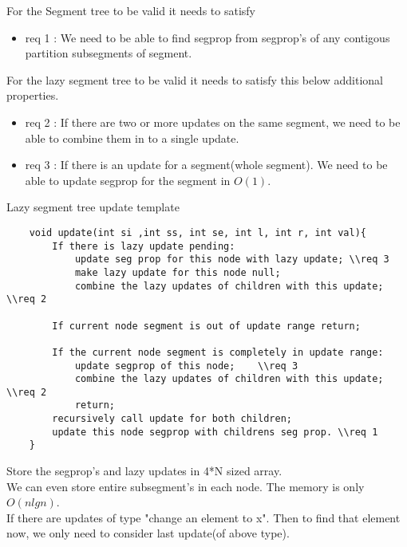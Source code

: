 \documentclass[../Notes.tex]{subfiles}
\begin{document}
For the Segment tree to be valid it needs to satisfy
\begin{itemize}
	\item req 1 : We need to be able to find segprop from segprop's of any contigous partition subsegments of segment. 
\end{itemize}

For the lazy segment tree to be valid it needs to satisfy this below additional properties.
\begin{itemize}
	\item req 2 : If there are two or more updates on the same segment, we need to be able to combine them in to a single update.
	\item req 3 : If there is an update for a segment(whole segment). We need to be able to update segprop for the segment in $O(1)$.
\end{itemize}
Lazy segment tree update template
\begin{lstlisting}
	void update(int si ,int ss, int se, int l, int r, int val){
		If there is lazy update pending:
			update seg prop for this node with lazy update;	\\req 3
			make lazy update for this node null;
			combine the lazy updates of children with this update;	\\req 2
		
		If current node segment is out of update range return;
		
		If the current node segment is completely in update range:
			update segprop of this node;	\\req 3
			combine the lazy updates of children with this update; \\req 2
			return;
		recursively call update for both children;
		update this node segprop with childrens seg prop. \\req 1
	}
\end{lstlisting}

Store the segprop's and lazy updates in 4*N sized array.\\

We can even store entire subsegment's in each node. The memory is only $O(nlgn)$.\\

If there are updates of type "change an element to x". Then to find that element now, we only need to consider last update(of above type).\\
\end{document}
